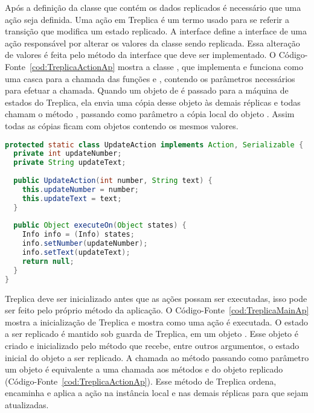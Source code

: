 Após a definição da classe que contém os dados replicados é necessário que uma ação seja definida. Uma ação em Treplica é um termo usado para se referir a transição que modifica um estado replicado. A interface  define a interface de uma ação responsável por alterar os valores da classe sendo replicada. Essa alteração de valores é feita pelo método  da interface  que deve ser implementado. O Código-Fonte~\ref{cod:TreplicaActionAp} mostra a classe , que implementa  e funciona como uma casca para a chamada das funções  e , contendo os parâmetros necessários para efetuar a chamada. Quando um objeto de  é passado para a máquina de estados do Treplica, ela envia uma cópia desse objeto às demais réplicas e todas chamam o método , passando como parâmetro a cópia local do objeto . Assim todas as cópias ficam com objetos  contendo os mesmos valores.

\begin{lstlisting}[language=Java, caption={Exemplo de classe que altera os valores replicados}, label={cod:TreplicaActionAp}]
protected static class UpdateAction implements Action, Serializable {
  private int updateNumber;
  private String updateText;	
	
  public UpdateAction(int number, String text) {
    this.updateNumber = number;
    this.updateText = text;
  }	
	
  public Object executeOn(Object states) {
    Info info = (Info) states;
    info.setNumber(updateNumber);
    info.setText(updateText);
    return null;
  }
}
\end{lstlisting}
 
Treplica deve ser inicializado antes que as ações possam ser executadas, isso pode ser feito pelo próprio método  da aplicação. O Código-Fonte~\ref{cod:TreplicaMainAp} mostra a inicialização de Treplica e mostra como uma ação é executada. O estado a ser replicado é mantido sob guarda de Treplica, em um objeto . Esse objeto é criado e inicializado pelo método  que recebe, entre outros argumentos, o estado inicial do objeto a ser replicado. A chamada ao método  passando como parâmetro um objeto  é equivalente a uma chamada aos métodos  e  do objeto replicado (Código-Fonte~\ref{cod:TreplicaActionAp}). Esse método de Treplica ordena, encaminha e aplica a ação na instância local e nas demais réplicas para que sejam atualizadas.

